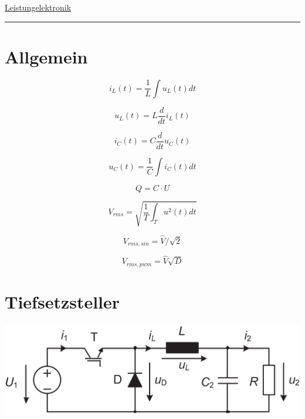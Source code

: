 \documentclass[10pt,landscape]{scrartcl}
\newcommand{\eqn}[3]
{
  \begin{minipage}[#1]{#2}
    \[ #3 \]
  \end{minipage}
}
\begin{document}
\raggedright
\footnotesize
\begin{multicols}{2}



\setlength{\premulticols}{1pt}
\setlength{\postmulticols}{1pt}
\setlength{\multicolsep}{1pt}
\setlength{\columnsep}{2pt}

\begin{center}
     \Large{\underline{Leistungelektronik}} \\
\end{center}


 \vspace{2mm} \hrule
\section{Allgemein}
\eqn{h}{0.23\linewidth}{ i_L(t) = \frac{1}{L}\int u_L(t)dt }
\eqn{h}{0.23\linewidth}{ u_L(t) = L\frac{d}{dt}i_L(t) }
\eqn{h}{0.23\linewidth}{ i_C(t) = C\frac{d}{dt}u_C(t) }
\eqn{h}{0.23\linewidth}{ u_C(t) = \frac{1}{C}\int i_C(t)dt }


\eqn{h}{0.15\linewidth}{ Q=C\cdot U }

\eqn{h}{0.23\linewidth}{ V_{rms} = \sqrt{ \frac{1}{T} \int_T u^2(t)dt } }
\eqn{h}{0.23\linewidth}{V_{rms,sin} = \hat{V} / \sqrt{2}} \eqn{h}{0.23\linewidth}{V_{rms,pwm} = \hat{V} \sqrt{D}}

\vfill\null
\columnbreak
\section{Tiefsetzsteller}

\begin{center}
\includegraphics[width=0.8\linewidth]{img/sch_buck.png}%
\end{center}


\end{multicols}
\end{document}
